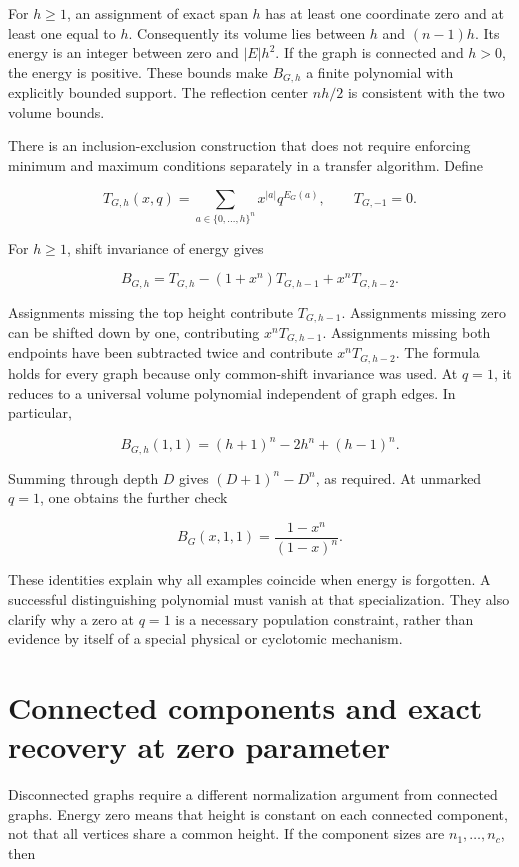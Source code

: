 \documentclass[
  11pt,
  a4paper,
]{report}
\begin{document}
For \(h\ge1\), an assignment of exact span \(h\) has at least one
coordinate zero and at least one equal to \(h\). Consequently its volume
lies between \(h\) and \((n-1)h\). Its energy is an integer between zero
and \(|E|h^2\). If the graph is connected and \(h>0\), the energy is
positive. These bounds make \(B_{G,h}\) a finite polynomial with
explicitly bounded support. The reflection center \(nh/2\) is consistent
with the two volume bounds.

There is an inclusion-exclusion construction that does not require
enforcing minimum and maximum conditions separately in a transfer
algorithm. Define

\[
T_{G,h}(x,q)=\sum_{a\in\{0,\ldots,h\}^n}x^{|a|}q^{E_G(a)},
\qquad T_{G,-1}=0.
\]

For \(h\ge1\), shift invariance of energy gives

\[
B_{G,h}=T_{G,h}-(1+x^n)T_{G,h-1}+x^nT_{G,h-2}.
\tag{SNG-I005}
\]

Assignments missing the top height contribute \(T_{G,h-1}\). Assignments
missing zero can be shifted down by one, contributing \(x^nT_{G,h-1}\).
Assignments missing both endpoints have been subtracted twice and
contribute \(x^nT_{G,h-2}\). The formula holds for every graph because
only common-shift invariance was used. At \(q=1\), it reduces to a
universal volume polynomial independent of graph edges. In particular,

\[
B_{G,h}(1,1)=(h+1)^n-2h^n+(h-1)^n.
\]

Summing through depth \(D\) gives \((D+1)^n-D^n\), as required. At
unmarked \(q=1\), one obtains the further check

\[
B_G(x,1,1)=\frac{1-x^n}{(1-x)^n}.
\]

These identities explain why all examples coincide when energy is
forgotten. A successful distinguishing polynomial must vanish at that
specialization. They also clarify why a zero at \(q=1\) is a necessary
population constraint, rather than evidence by itself of a special
physical or cyclotomic mechanism.

\hypertarget{connected-components-and-exact-recovery-at-zero-parameter}{%
\section{Connected components and exact recovery at zero
parameter}\label{connected-components-and-exact-recovery-at-zero-parameter}}

Disconnected graphs require a different normalization argument from
connected graphs. Energy zero means that height is constant on each
connected component, not that all vertices share a common height. If the
component sizes are \(n_1,\ldots,n_c\), then
\end{document}
